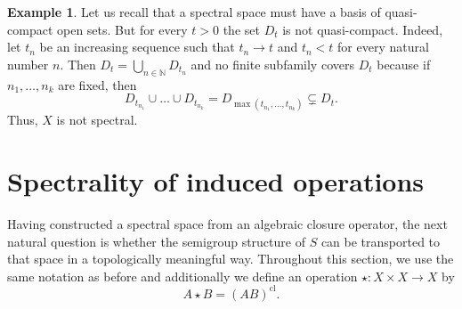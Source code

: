 \documentclass[10pt, reqno]{amsart}
\theoremstyle{plain}
\theoremstyle{definition}
\newtheorem{example}[theorem]{Example}
\begin{document}
\begin{example}
    Let us recall that a spectral space must have a basis of quasi-compact open sets. But for every $t > 0$ the set $D_t$ is not quasi-compact. Indeed, let $t_n$ be an increasing sequence such that $t_n \rightarrow t$ and $t_n < t$ for every natural number $n$. Then $D_t = \bigcup_{n \in \mathbb{N}} D_{t_n}$ and no finite subfamily covers $D_t$ because if $n_1, \ldots, n_k$ are fixed, then 
    \begin{equation*}
        D_{t_{n_1}} \cup \ldots \cup D_{t_{n_k}} = D_{\max(t_{n_1}, \ldots, t_{n_k})} \subsetneq D_t. 
    \end{equation*}
    Thus, $X$ is not spectral. 
\end{example}

\section{Spectrality of induced operations}\label{topological_semigroups_whose_underlying_space_is_spectral}
Having constructed a spectral space from an algebraic closure operator, the next natural question is whether the semigroup structure of $S$ can be transported to that space in a topologically meaningful way.  
Throughout this section, we use the same notation as before and additionally we define an operation $\star : X \times X \rightarrow X$ by 
\begin{equation*}
    A \star B = (AB)^\mathrm{cl}. 
\end{equation*}
\end{document}
